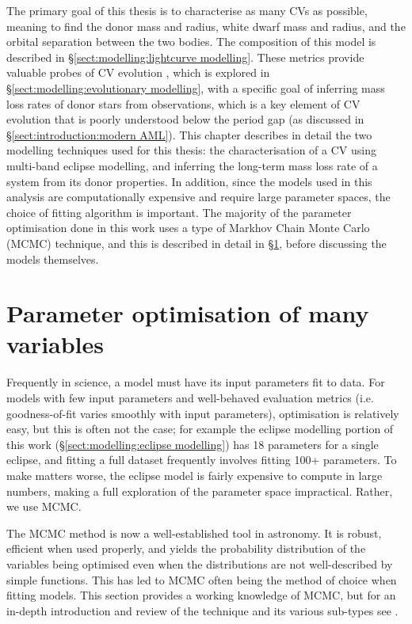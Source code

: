 \label{chpt:modelling and techniques}

The primary goal of this thesis is to characterise as many CVs as possible, meaning to find the donor mass and radius, white dwarf mass and radius, and the orbital separation between the two bodies. The composition of this model is described in \S\ref{sect:modelling:lightcurve modelling}.
These metrics provide valuable probes of CV evolution \citep{knigge2006}, which is explored in \S\ref{sect:modelling:evolutionary modelling}, with a specific goal of inferring mass loss rates of donor stars from observations, which is a key element of CV evolution that is poorly understood below the period gap (as discussed in \S\ref{sect:introduction:modern AML}).
This chapter describes in detail the two modelling techniques used for this thesis: the characterisation of a CV using multi-band eclipse modelling, and inferring the long-term mass loss rate of a system from its donor properties.
In addition, since the models used in this analysis are computationally expensive and require large parameter spaces, the choice of fitting algorithm is important. The majority of the parameter optimisation done in this work uses a type of Markhov Chain Monte Carlo (MCMC) technique, and this is described in detail in \S\ref{sect:modelling:parameter optimisation of many variables}, before discussing the models themselves.


\section{Parameter optimisation of many variables}
\label{sect:modelling:parameter optimisation of many variables}
Frequently in science, a model must have its input parameters fit to data. For models with few input parameters and well-behaved evaluation metrics (i.e. goodness-of-fit varies smoothly with input parameters), optimisation is relatively easy, but this is often not the case; for example the eclipse modelling portion of this work (\S\ref{sect:modelling:eclipse modelling}) has 18 parameters for a single eclipse, and fitting a full dataset frequently involves fitting  100+ parameters. To make matters worse, the eclipse model is fairly expensive to compute in large numbers, making a full exploration of the parameter space impractical. Rather, we use MCMC.

The MCMC method is now a well-established tool in astronomy. It is robust, efficient when used properly, and yields the probability distribution of the variables being optimised even when the distributions are not well-described by simple functions. This has led to MCMC often being the method of choice when fitting models.
This section provides a working knowledge of MCMC, but for an in-depth introduction and review of the technique and its various sub-types see \citet{sharma2017}.


